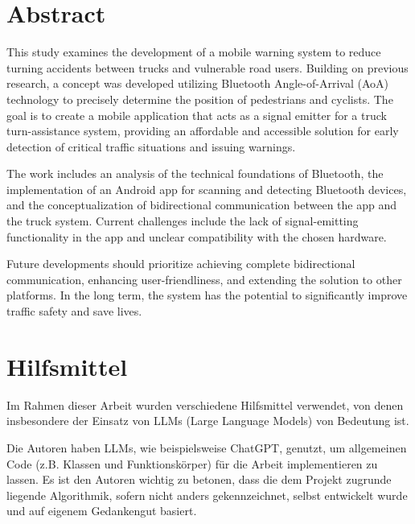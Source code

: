 \documentclass[a4paper, 12pt]{article} %
\begin{document}
\section*{Abstract}
\begin{spacing}{1.8}  %
    \fontsize{14pt}{14pt}\selectfont  %
    This study examines the development of a mobile warning system to reduce turning accidents between trucks and vulnerable road users. Building on previous research, a concept was developed utilizing Bluetooth Angle-of-Arrival (AoA) technology 
    to precisely determine the position of pedestrians and cyclists.
    The goal is to create a mobile application that acts as a signal 
    emitter for a truck turn-assistance system, providing an affordable
     and accessible solution for early detection of critical traffic 
     situations and issuing warnings.

    The work includes an analysis of the technical 
    foundations of Bluetooth, the implementation of an Android 
    app for scanning and detecting Bluetooth devices, 
    and the conceptualization of bidirectional communication
     between the app and the truck system. Current challenges 
     include the lack of signal-emitting functionality in the app 
     and unclear compatibility with the chosen hardware.
    
    Future developments should prioritize achieving complete 
    bidirectional communication, enhancing user-friendliness, 
    and extending the solution to other platforms. In the long term,
     the system has the potential to significantly improve traffic safety
      and save lives.

\end{spacing}
\clearpage

\section*{Hilfsmittel}
\begin{spacing}{1.8}  %
    \fontsize{14pt}{15pt}\selectfont  %

    Im Rahmen dieser Arbeit wurden verschiedene Hilfsmittel verwendet, von denen
    insbesondere der Einsatz von LLMs (Large Language Models) von Bedeutung ist.
    
    Die Autoren haben LLMs, wie beispielsweise ChatGPT, genutzt, um allgemeinen
    Code (z.B. Klassen und Funktionskörper) für die Arbeit implementieren zu lassen.
    Es ist den Autoren wichtig zu betonen, dass die dem Projekt zugrunde liegende
    Algorithmik, sofern nicht anders gekennzeichnet, selbst entwickelt wurde und auf
    eigenem Gedankengut basiert.

\end{spacing}
\end{document}
